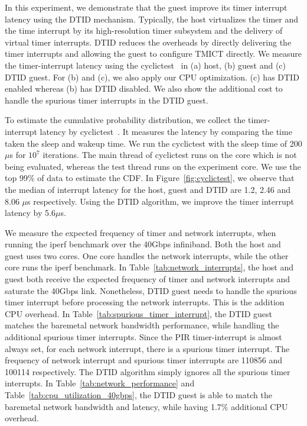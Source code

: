 In this experiment, we demonstrate that the guest improve its
timer interrupt latency using the DTID mechanism. Typically,
the host virtualizes the timer and the time interrupt by its
high-resolution timer subsystem and the delivery of virtual
timer interrupts. DTID reduces the overheads by directly
delivering the timer interrupts and allowing the guest to
configure TMICT directly. We measure the timer-interrupt
latency using the cyclictest~\cite{cyclictest} in (a) host,
(b) guest and (c) DTID guest. For (b) and (c), we also apply
our CPU optimization. (c) has DTID enabled whereas (b) has
DTID disabled. We also show the additional cost to handle the
spurious timer interrupts in the DTID guest.

To estimate the cumulative probability distribution, we
collect the timer-interrupt latency by
cyclictest~\cite{cyclictest}. It measures the latency by
comparing the time taken the sleep and wakeup time. We run the
cyclictest with the sleep time of 200$\mu$s for $10^7$
iterations. The main thread of cyclictest runs on the core
which is not being evaluated, whereas the test thread runs on
the experiment core. We use the top 99\% of data to estimate
the CDF. In Figure~\ref{fig:cyclictest}, we observe that the
median of interrupt latency for the host, guest and DTID are
1.2, 2.46 and 8.06 $\mu$s respectively. Using the DTID
algorithm, we improve the timer interrupt latency by
5.6$\mu$s.

We measure the expected frequency of timer and network
interrupts, when running the iperf benchmark over the 40Gbps
infiniband. Both the host and guest uses two cores. One core
handles the network interrupts, while the other core runs the
iperf benchmark. In Table~\ref{tab:network_interrupts}, the
host and guest both receive the expected frequency of timer
and network interrupts and saturate the 40Gbps link.
Nonetheless, DTID guest needs to handle the spurious timer
interrupt before processing the network interrupts. This is
the addition CPU overhead. In
Table~\ref{tab:spurious_timer_interrupt}, the DTID guest
matches the baremetal network bandwidth performance, while
handling the additional spurious timer interrupts. Since the
PIR timer-interrupt is almost always set, for each network
interrupt, there is a spurious timer interrupt. The frequency
of network interrupt and spurious timer interrupts are 110856
and 100114 respectively. The DTID algorithm simply ignores all
the spurious timer interrupts. In
Table~\ref{tab:network_performance} and
Table~\ref{tab:cpu_utilization_40gbps}, the DTID guest is able
to match the baremetal network bandwidth and latency, while
having 1.7\% additional CPU overhead.

